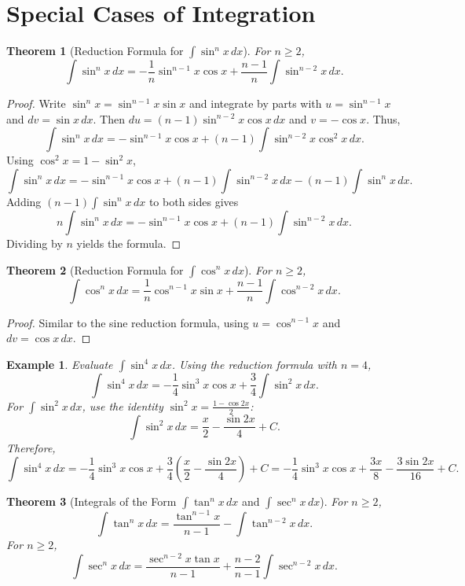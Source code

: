 \documentclass[11pt,a4paper]{article}
\newtheorem{example}{Example}
\newtheorem{theorem}{Theorem}
\begin{document}
\section{Special Cases of Integration}
\begin{theorem}[Reduction Formula for $\int \sin^n x \, dx$]
For $n \geq 2$,
\[
\int \sin^n x \, dx = -\frac{1}{n} \sin^{n-1} x \cos x + \frac{n-1}{n} \int \sin^{n-2} x \, dx.
\]
\end{theorem}
\begin{proof}
Write $\sin^n x = \sin^{n-1} x \sin x$ and integrate by parts with $u = \sin^{n-1} x$ and $dv = \sin x \, dx$. Then $du = (n-1)\sin^{n-2} x \cos x \, dx$ and $v = -\cos x$. Thus,
\[
\int \sin^n x \, dx = -\sin^{n-1} x \cos x + (n-1) \int \sin^{n-2} x \cos^2 x \, dx.
\]
Using $\cos^2 x = 1 - \sin^2 x$,
\[
\int \sin^n x \, dx = -\sin^{n-1} x \cos x + (n-1) \int \sin^{n-2} x \, dx - (n-1) \int \sin^n x \, dx.
\]
Adding $(n-1)\int \sin^n x \, dx$ to both sides gives
\[
n \int \sin^n x \, dx = -\sin^{n-1} x \cos x + (n-1) \int \sin^{n-2} x \, dx.
\]
Dividing by $n$ yields the formula.
\end{proof}
\begin{theorem}[Reduction Formula for $\int \cos^n x \, dx$]
For $n \geq 2$,
\[
\int \cos^n x \, dx = \frac{1}{n} \cos^{n-1} x \sin x + \frac{n-1}{n} \int \cos^{n-2} x \, dx.
\]
\end{theorem}
\begin{proof}
Similar to the sine reduction formula, using $u = \cos^{n-1} x$ and $dv = \cos x \, dx$.
\end{proof}
\begin{example}
Evaluate $\displaystyle \int \sin^4 x \, dx$.
Using the reduction formula with $n = 4$,
\[
\int \sin^4 x \, dx = -\frac{1}{4} \sin^3 x \cos x + \frac{3}{4} \int \sin^2 x \, dx.
\]
For $\int \sin^2 x \, dx$, use the identity $\sin^2 x = \frac{1 - \cos 2x}{2}$:
\[
\int \sin^2 x \, dx = \frac{x}{2} - \frac{\sin 2x}{4} + C.
\]
Therefore,
\[
\int \sin^4 x \, dx = -\frac{1}{4} \sin^3 x \cos x + \frac{3}{4} \left( \frac{x}{2} - \frac{\sin 2x}{4} \right) + C = -\frac{1}{4} \sin^3 x \cos x + \frac{3x}{8} - \frac{3 \sin 2x}{16} + C.
\]
\end{example}
\begin{theorem}[Integrals of the Form $\int \tan^n x \, dx$ and $\int \sec^n x \, dx$]
For $n \geq 2$,
\[
\int \tan^n x \, dx = \frac{\tan^{n-1} x}{n-1} - \int \tan^{n-2} x \, dx.
\]
For $n \geq 2$,
\[
\int \sec^n x \, dx = \frac{\sec^{n-2} x \tan x}{n-1} + \frac{n-2}{n-1} \int \sec^{n-2} x \, dx.
\]
\end{theorem}
\end{document}
